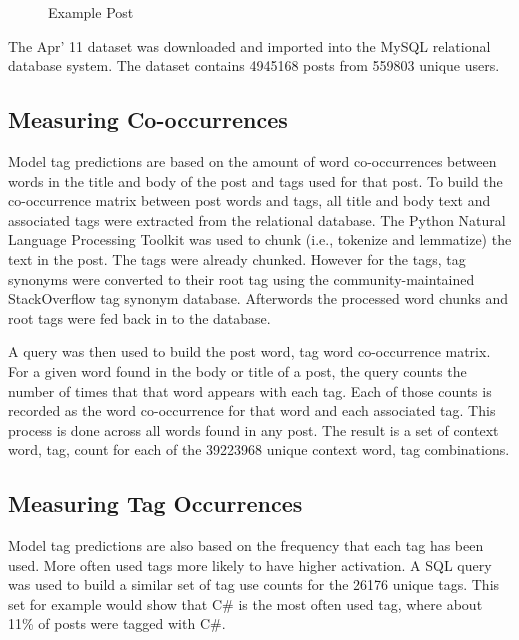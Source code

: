 \documentclass[10pt,letterpaper]{article}
\begin{document}
\begin{figure}[ht]
  \centering
  \caption{Example Post}
  \label{fig:examplePost}
\end{figure}


The Apr' 11 dataset \cite{DataDump2011} was downloaded and imported into the MySQL relational database system.
The dataset contains \num{4945168} posts from \num{559803} unique users.

\subsection{Measuring Co-occurrences}

Model tag predictions are based on the amount of word co-occurrences between words in the title and body of the post and tags used for that post.
To build the co-occurrence matrix between post words and tags, all title and body text and associated tags were extracted from the relational database.
The Python Natural Language Processing Toolkit \cite{Bird2009} was used to chunk (i.e., tokenize and lemmatize) the text in the post.
The tags were already chunked.
However for the tags, tag synonyms were converted to their root tag using the community-maintained StackOverflow tag synonym database.
Afterwords the processed word chunks and root tags were fed back in to the database.

A query was then used to build the post word, tag word co-occurrence matrix.
For a given word found in the body or title of a post, the query counts the number of times that that word appears with each tag.
Each of those counts is recorded as the word co-occurrence for that word and each associated tag.
This process is done across all words found in any post.
The result is a set of context word, tag, count for each of the \num{39223968} unique context word, tag combinations.

\subsection{Measuring Tag Occurrences}

Model tag predictions are also based on the frequency that each tag has been used.
More often used tags more likely to have higher activation.
A SQL query was used to build a similar set of tag use counts for the \num{26176} unique tags.
This set for example would show that C\# is the most often used tag, where about 11\% of posts were tagged with C\#.
\end{document}
